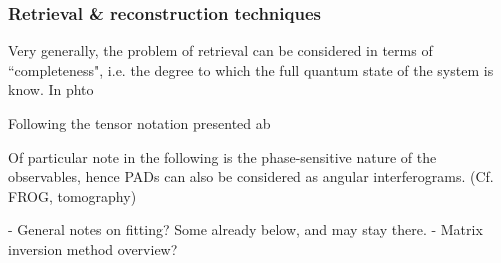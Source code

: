 \subsubsection{Retrieval \& reconstruction techniques}

Very generally, the problem of retrieval can be considered in terms of ``completeness", i.e. the degree to which the full quantum state of the system is know. In phto

Following the tensor notation presented ab

Of particular note in the following is the phase-sensitive nature of the observables, hence PADs can also be considered as angular interferograms. (Cf. FROG, tomography)

- General notes on fitting? Some already below, and may stay there.
- Matrix inversion method overview?